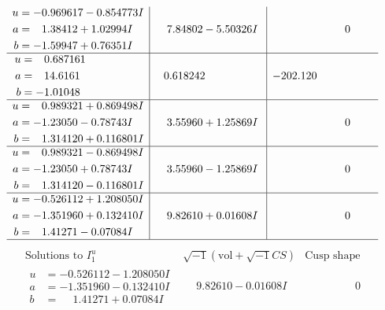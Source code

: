 \documentclass[1p]{elsarticle_modified}
\theoremstyle{definition}
\newcommand{\I}{\sqrt{-1}}
\begin{document}
$$\begin{array}{c|c|c}
\begin{aligned}
u &= -0.969617 - 0.854773 I \\
a &= \phantom{-}1.38412 + 1.02994 I \\
b &= -1.59947 + 0.76351 I\end{aligned}
 & \phantom{-}7.84802 - 5.50326 I & \phantom{-0.000000 } 0 \\ \hline\begin{aligned}
u &= \phantom{-}0.687161\phantom{ +0.000000I} \\
a &= \phantom{-}14.6161\phantom{ +0.000000I} \\
b &= -1.01048\phantom{ +0.000000I}\end{aligned}
 & \phantom{-}0.618242\phantom{ +0.000000I} & -202.120\phantom{ +0.000000I} \\ \hline\begin{aligned}
u &= \phantom{-}0.989321 + 0.869498 I \\
a &= -1.23050 - 0.78743 I \\
b &= \phantom{-}1.314120 + 0.116801 I\end{aligned}
 & \phantom{-}3.55960 + 1.25869 I & \phantom{-0.000000 } 0 \\ \hline\begin{aligned}
u &= \phantom{-}0.989321 - 0.869498 I \\
a &= -1.23050 + 0.78743 I \\
b &= \phantom{-}1.314120 - 0.116801 I\end{aligned}
 & \phantom{-}3.55960 - 1.25869 I & \phantom{-0.000000 } 0 \\ \hline\begin{aligned}
u &= -0.526112 + 1.208050 I \\
a &= -1.351960 + 0.132410 I \\
b &= \phantom{-}1.41271 - 0.07084 I\end{aligned}
 & \phantom{-}9.82610 + 0.01608 I & \phantom{-0.000000 } 0\\
 \hline 
 \end{array}$$\newpage$$\begin{array}{c|c|c}  
\text{Solutions to }I^u_{1}& \I (\text{vol} + \sqrt{-1}CS) & \text{Cusp shape}\\
 \hline 
\begin{aligned}
u &= -0.526112 - 1.208050 I \\
a &= -1.351960 - 0.132410 I \\
b &= \phantom{-}1.41271 + 0.07084 I\end{aligned}
 & \phantom{-}9.82610 - 0.01608 I & \phantom{-0.000000 } 0 \\ \hline\begin{aligned}

\end{aligned}
\end{array}$$
\end{document}
